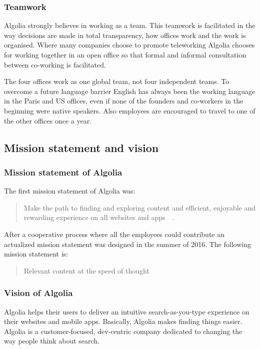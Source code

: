 \subsubsection{Teamwork}

Algolia strongly believes in working as a team. This teamwork is facilitated in the way decisions are made in total transparency, how offices work and the work is organised. Where many companies choose to promote teleworking Algolia chooses for working together in an open office so that formal and informal consultation between co-working is facilitated.

The four offices work as one global team, not four independent teams. To overcome a future language barrier English has always been the working language in the Paris and US offices, even if none of the founders and co-workers in the beginning were native speakers. Also employees are encouraged to travel to one of the other offices once a year. 

\subsection{Mission statement and vision}
\subsubsection{Mission statement of Algolia}

The first mission statement of Algolia was:

\begin{quote}
Make the path to finding and exploring content and efficient, enjoyable and rewarding experience on all websites and apps~\cite{algolia-glassdoor}~.
\end{quote}

After a cooperative process where all the employees could contribute an actualized mission statement was designed in the summer of 2016. The following mission statement is:

\begin{quote}
Relevant content at the speed of thought
\end{quote}

\subsubsection{Vision of Algolia}

Algolia helps their users to deliver an intuitive search-as-you-type experience on their websites and mobile apps. Basically, Algolia makes finding things easier. Algolia is a customer-focused, dev-centric company dedicated to changing the way people think about search.

